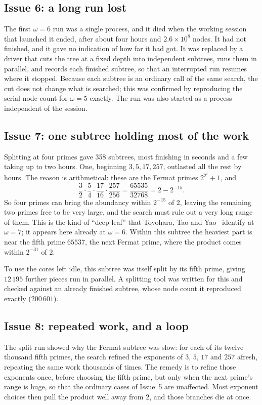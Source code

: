 \documentclass[11pt]{amsart}
\theoremstyle{remark}
\begin{document}
\subsection{Issue 6: a long run lost}
The first $\omega = 6$ run was a single process, and it died when the working
session that launched it ended, after about four hours and $2.6 \times 10^8$
nodes. It had not finished, and it gave no indication of how far it had got. It
was replaced by a driver that cuts the tree at a fixed depth into independent
subtrees, runs them in parallel, and records each finished subtree, so that an
interrupted run resumes where it stopped. Because each subtree is an ordinary
call of the same search, the cut does not change what is searched; this was
confirmed by reproducing the serial node count for $\omega = 5$ exactly. The
run was also started as a process independent of the session.

\subsection{Issue 7: one subtree holding most of the work}
Splitting at four primes gave 358 subtrees, most finishing in seconds and a few
taking up to two hours. One, beginning $3, 5, 17, 257$, outlasted all the rest
by hours. The reason is arithmetical: these are the Fermat primes
$2^{2^i} + 1$, and
\[
  \frac{3}{2}\cdot\frac{5}{4}\cdot\frac{17}{16}\cdot\frac{257}{256}
  = \frac{65535}{32768} = 2 - 2^{-15}.
\]
So four primes can bring the abundancy within $2^{-15}$ of $2$, leaving the
remaining two primes free to be very large, and the search must rule out a very
long range of them. This is the kind of ``deep leaf'' that Toyohara, Tao and
Yao~\cite{tty} identify at $\omega = 7$; it appears here already at $\omega = 6$.
Within this subtree the heaviest part is near the fifth prime $65537$, the next
Fermat prime, where the product comes within $2^{-31}$ of $2$.

To use the cores left idle, this subtree was itself split by its fifth prime,
giving $12\,195$ further pieces run in parallel. A splitting tool was written
for this and checked against an already finished subtree, whose node count it
reproduced exactly ($200\,601$).

\subsection{Issue 8: repeated work, and a loop}
The split run showed why the Fermat subtree was slow: for each of its twelve
thousand fifth primes, the search refined the exponents of $3$, $5$, $17$ and
$257$ afresh, repeating the same work thousands of times. The remedy is to refine
those exponents once, before choosing the fifth prime, but only when the next
prime's range is huge, so that the ordinary cases of Issue~5 are unaffected.
Most exponent choices then pull the product well away from $2$, and those
branches die at once.
\end{document}

